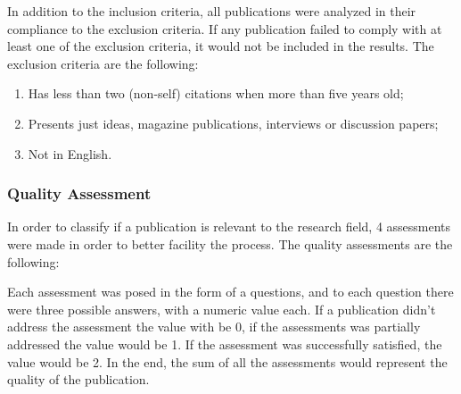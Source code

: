 In addition to the inclusion criteria, all publications were analyzed in their compliance to the exclusion criteria. If any publication failed to comply with at least one of the exclusion criteria, it would not be included in the results. The exclusion criteria are the following:

\begin{enumerate}
    \item Has less than two (non-self) citations when more than five years old;
    \item Presents just ideas, magazine publications, interviews or discussion papers;
    \item Not in English.
\end{enumerate}{}

\subsubsection{Quality Assessment}\label{sec:quality_accessment}

In order to classify if a publication is relevant to the research field, 4 assessments were made in order to better facility the process. The quality assessments are the following:\\

\captionsetup{belowskip=12pt,aboveskip=4pt}
\begin{table}[ht]
    \centering
    \caption{Parameters for measuring the quality of a publication}
    \label{tab:quality_assessment}
\end{table}{}

Each assessment was posed in the form of a questions, and to each question there were three possible answers, with a numeric value each. If a publication didn't address the assessment the value with be 0, if the assessments was partially addressed the value would be 1. If the assessment was successfully satisfied, the value would be 2. In the end, the sum of all the assessments would represent the quality of the publication.

